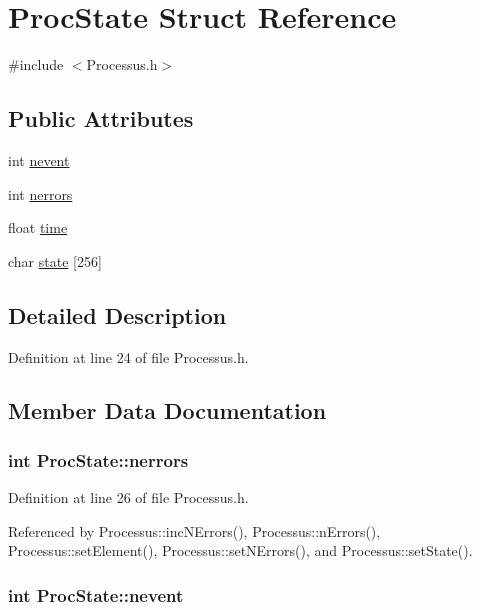 \hypertarget{structProcState}{
\section{ProcState Struct Reference}
\label{structProcState}
}


{\ttfamily \#include $<$Processus.h$>$}\subsection*{Public Attributes}
\begin{DoxyCompactItemize}
\item 
int \hyperlink{structProcState_a1881d6b0db849a8af15f586ad5959260}{nevent}
\item 
int \hyperlink{structProcState_a51a0f54ba62b07e07ac8518c5f32828d}{nerrors}
\item 
float \hyperlink{structProcState_a88c69b099d8f2b2164d478f28e87610f}{time}
\item 
char \hyperlink{structProcState_aaffb70e5af437e2c0d4dfc69bd0b24cd}{state} \mbox{[}256\mbox{]}
\end{DoxyCompactItemize}


\subsection{Detailed Description}


Definition at line 24 of file Processus.h.

\subsection{Member Data Documentation}
\hypertarget{structProcState_a51a0f54ba62b07e07ac8518c5f32828d}{
\subsubsection[{nerrors}]{\setlength{\rightskip}{0pt plus 5cm}int {\bf ProcState::nerrors}}}
\label{structProcState_a51a0f54ba62b07e07ac8518c5f32828d}


Definition at line 26 of file Processus.h.

Referenced by Processus::incNErrors(), Processus::nErrors(), Processus::setElement(), Processus::setNErrors(), and Processus::setState().\hypertarget{structProcState_a1881d6b0db849a8af15f586ad5959260}{
\subsubsection[{nevent}]{\setlength{\rightskip}{0pt plus 5cm}int {\bf ProcState::nevent}}}
\label{structProcState_a1881d6b0db849a8af15f586ad5959260}


